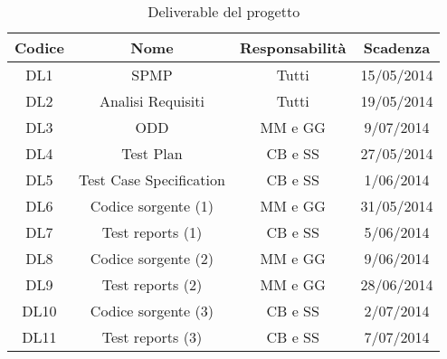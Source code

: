 \begin{table}[b]
	\begin{tabular}{|c|c|c|c|}
	\hline
	\textbf{Codice} & \textbf{Nome} & \textbf{Responsabilità} & \textbf{Scadenza}\\
	\hline
	DL1	& SPMP						& Tutti			& 15/05/2014\\
	\hline
	DL2	& Analisi Requisiti			& Tutti			& 19/05/2014\\
	\hline
	DL3	& ODD						& MM e GG		& 9/07/2014\\
	\hline
	DL4 & Test Plan					& CB e SS		& 27/05/2014\\
	\hline
	DL5 & Test Case Specification	& CB e SS	 	& 1/06/2014\\
	\hline
	DL6 & Codice sorgente (1)		& MM e GG		& 31/05/2014\\
	\hline
	DL7 & Test reports (1)			& CB e SS		& 5/06/2014\\
	\hline
	DL8 & Codice sorgente (2)		& MM e GG		& 9/06/2014\\
	\hline
	DL9 & Test reports (2)			& MM e GG		& 28/06/2014\\
	\hline
	DL10& Codice sorgente (3)		& CB e SS		& 2/07/2014\\
	\hline
	DL11& Test reports (3)			& CB e SS		& 7/07/2014\\
	\hline
	\end{tabular}
	\caption{Deliverable del progetto}
	\label{overview:deliverable}
\end{table}